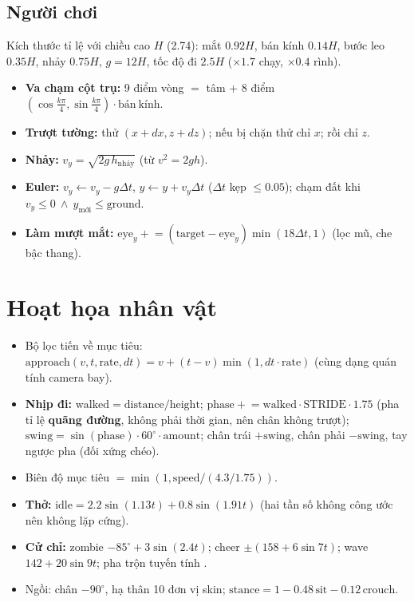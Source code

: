 \subsection{Người chơi}
Kích thước tỉ lệ với chiều cao $H$ (2.74): mắt $0.92H$, bán kính $0.14H$, bước leo $0.35H$, nhảy $0.75H$, $g=12H$, tốc độ đi $2.5H$ ($\times1.7$ chạy, $\times0.4$ rình).
\begin{itemize}
\item \textbf{Va chạm cột trụ:} 9 điểm vòng  $=$ tâm + 8 điểm $(\cos\frac{k\pi}{4},\sin\frac{k\pi}{4})\cdot\mathrm{bán\ kính}$.
\item \textbf{Trượt tường:} thử $(x+dx,z+dz)$; nếu bị chặn thử chỉ $x$; rồi chỉ $z$.
\item \textbf{Nhảy:} $v_y=\sqrt{2g\,h_{\mathrm{nhảy}}}$ (từ $v^2=2gh$).
\item \textbf{Euler:} $v_y\leftarrow v_y-g\Delta t$, $y\leftarrow y+v_y\Delta t$ ($\Delta t$ kẹp $\le0.05$); chạm đất khi $v_y\le0\ \land\ y_{\mathrm{mới}}\le\mathrm{ground}$.
\item \textbf{Làm mượt mắt:} $\mathrm{eye}_y\mathrel{+}=(\mathrm{target}-\mathrm{eye}_y)\min(18\Delta t,1)$ (lọc mũ, che bậc thang).
\end{itemize}

\section{Hoạt họa nhân vật}\label{s:anim}
\begin{itemize}
\item Bộ lọc tiến về mục tiêu: $\mathrm{approach}(v,t,\mathrm{rate},dt)=v+(t-v)\min(1,dt\cdot\mathrm{rate})$ (cùng dạng quán tính camera bay).
\item \textbf{Nhịp đi:} $\mathrm{walked}=\mathrm{distance}/\mathrm{height}$; $\mathrm{phase}\mathrel{+}=\mathrm{walked}\cdot\mathrm{STRIDE}\cdot1.75$ (pha tỉ lệ \textbf{quãng đường}, không phải thời gian, nên chân không trượt); $\mathrm{swing}=\sin(\mathrm{phase})\cdot60^\circ\cdot\mathrm{amount}$; chân trái $+\mathrm{swing}$, chân phải $-\mathrm{swing}$, tay ngược pha (đối xứng chéo).
\item Biên độ mục tiêu $=\min(1,\mathrm{speed}/(4.3/1.75))$.
\item \textbf{Thở:} $\mathrm{idle}=2.2\sin(1.13t)+0.8\sin(1.91t)$ (hai tần số không công ước nên không lặp cứng).
\item \textbf{Cử chỉ:} zombie $-85^\circ+3\sin(2.4t)$; cheer $\pm(158+6\sin7t)$; wave $142+20\sin9t$; pha trộn tuyến tính .
\item Ngồi: chân $-90^\circ$, hạ thân 10 đơn vị skin; $\mathrm{stance}=1-0.48\,\mathrm{sit}-0.12\,\mathrm{crouch}$.
\end{itemize}

